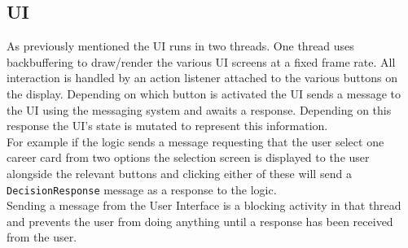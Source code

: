 \documentclass[a4paper, 11pt]{article}
\begin{document}
	\subsection*{UI}
	As previously mentioned the UI runs in two threads. One thread uses backbuffering to draw/render the various UI screens at a fixed frame rate. All interaction is handled by an action listener attached to the various buttons on the display. Depending on which button is activated the UI sends a message to the UI using the messaging system and awaits a response. Depending on this response the UI's state is mutated to represent this information.\\
	For example if the logic sends a message requesting that the user select one career card from two options the selection screen is displayed to the user alongside the relevant buttons and clicking either of these will send a \texttt{DecisionResponse} message as a response to the logic.\\
	Sending a message from the User Interface is a blocking activity in that thread and prevents the user from doing anything until a response has been received from the user.
	
\end{document}
